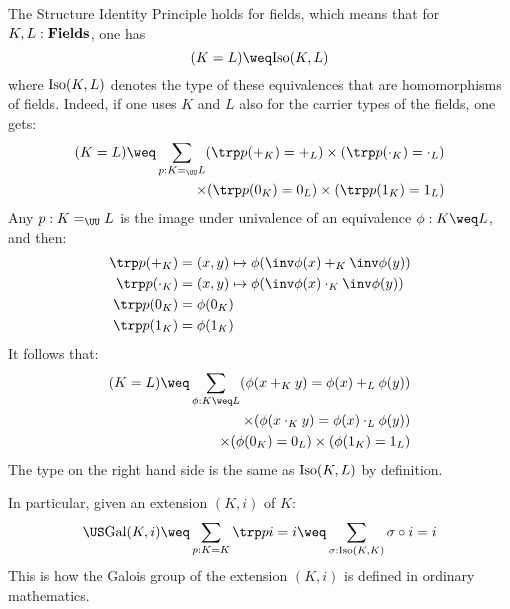 \begin{remark}
  \label{rem:sip-univalence}
  The Structure Identity Principle holds for fields, which means that for
  $K,L:\mathbf{Fields}$, one has
  \begin{displaymath}
    (K = L) \weq \iso(K,L)
  \end{displaymath}
  where $\mathrm{Iso}(K,L)$ denotes the type of these equivalences that are
  homomorphisms of fields. Indeed, if one uses $K$ and $L$ also for the carrier
  types of the fields, one gets:
  \begin{displaymath}
    \begin{split}
      (K = L) \weq \sum_{p:K=_\UU L}  (\trp p (+_K) = +_L)
      \times (\trp p (\cdot_K) = \cdot_L)
      \\ \times (\trp p (0_K) = 0_L)
      \times (\trp p (1_K) = 1_L) 
    \end{split}
  \end{displaymath}
  Any $p : K =_\UU L$ is the image under univalence of an equivalence $\phi: K \weq L$, and then:
  \begin{align*}
    \trp p (+_K) &= (x,y) \mapsto \phi( \inv\phi(x) +_K \inv \phi(y)) \\
    \trp p (\cdot_K) &= (x,y) \mapsto \phi( \inv\phi(x) \cdot_K \inv \phi(y)) \\
    \trp p (0_K) &=\phi( 0_K ) \\
    \trp p (1_K) &=\phi( 1_K )
  \end{align*}
  It follows that:
  \begin{displaymath}
    \begin{split}
      (K=L) \weq \sum_{\phi: K \weq L} (\phi(x +_K y) = \phi (x) +_L \phi (y)) \\
      \times (\phi(x\cdot_K y) = \phi (x) \cdot_L \phi (y)) \\
      \times (\phi(0_K) = 0_L)
        \times (\phi(1_K) = 1_L)
    \end{split}
  \end{displaymath}
  The type on the right hand side is the same as $\mathrm{Iso}(K,L)$ by definition.

  In particular, given an extension $(K,i)$ of $K$:
  \begin{align*}
    \US \Gal(K,i) \weq \sum_{p:K=K} \trp p i = i \weq \sum_{\sigma:\iso(K,K)} \sigma \circ i = i
  \end{align*}
  This is how the Galois group of the extension $(K,i)$ is defined in ordinary mathematics.
\end{remark}


